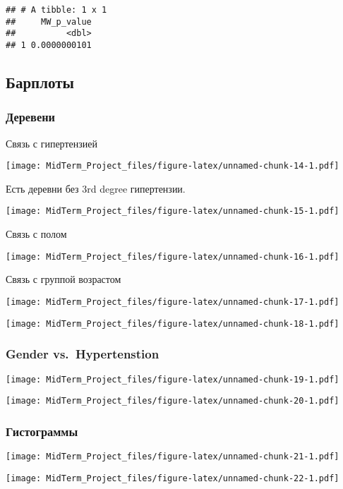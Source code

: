 \documentclass[
]{article}
\begin{document}
\begin{verbatim}
## # A tibble: 1 x 1
##     MW_p_value
##          <dbl>
## 1 0.0000000101
\end{verbatim}

\subsection{Барплоты}\label{ux431ux430ux440ux43fux43bux43eux442ux44b}

\subsubsection{Деревени}\label{ux434ux435ux440ux435ux432ux435ux43dux438}

Связь с гипертензией

\texttt{[image: MidTerm\_Project\_files/figure-latex/unnamed-chunk-14-1.pdf]}

Есть деревни без 3rd degree гипертензии.

\texttt{[image: MidTerm\_Project\_files/figure-latex/unnamed-chunk-15-1.pdf]}

Связь с полом

\texttt{[image: MidTerm\_Project\_files/figure-latex/unnamed-chunk-16-1.pdf]}

Связь с группой возрастом

\texttt{[image: MidTerm\_Project\_files/figure-latex/unnamed-chunk-17-1.pdf]}

\texttt{[image: MidTerm\_Project\_files/figure-latex/unnamed-chunk-18-1.pdf]}

\subsubsection{Gender vs.~Hypertenstion}\label{gender-vs.-hypertenstion}

\texttt{[image: MidTerm\_Project\_files/figure-latex/unnamed-chunk-19-1.pdf]}

\texttt{[image: MidTerm\_Project\_files/figure-latex/unnamed-chunk-20-1.pdf]}

\subsubsection{Гистограммы}\label{ux433ux438ux441ux442ux43eux433ux440ux430ux43cux43cux44b}

\texttt{[image: MidTerm\_Project\_files/figure-latex/unnamed-chunk-21-1.pdf]}

\texttt{[image: MidTerm\_Project\_files/figure-latex/unnamed-chunk-22-1.pdf]}
\end{document}
